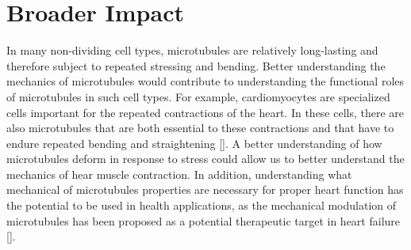 \documentclass[preprint,12pt,authoryear]{elsarticle}
\begin{document}
\section{Broader Impact}
In many non-dividing cell types, microtubules are relatively long-lasting and therefore subject to repeated stressing and bending. Better understanding the mechanics of microtubules would contribute to understanding the functional roles of microtubules in such cell types. For example, cardiomyocytes are specialized cells important for the repeated contractions of the heart. In these cells, there are also microtubules that are both essential to these contractions and that have to endure repeated bending and straightening [\cite{cardmy_review}]. A better understanding of how microtubules deform in response to stress could allow us to better understand the mechanics of hear muscle contraction. In addition, understanding what mechanical of microtubules properties are necessary for proper heart function has the potential to be used in health applications, as the mechanical modulation of microtubules has been proposed as a potential therapeutic target in heart failure [\cite{card_HF}]. 


\end{document}
